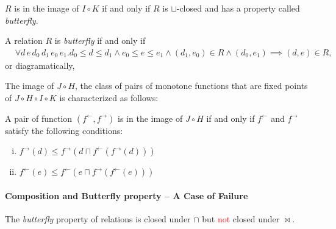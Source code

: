 \documentclass{llncs}
\newcommand{\ff}{{f^{\rightarrow}}}
\newcommand{\fb}{{f^{\leftarrow}}}
\newcommand{\join}{\sqcup}
\newcommand{\meet}{\sqcap}
\newcommand{\comp}{\circ}
\newcommand{\rotleq}{\rotatebox[origin=c]{90}{$\leq$}}
\newcommand{\red}[1]{\textcolor{red}{#1}}
\begin{document}
  \begin{proposition}\label{prop:butterfly}
    $R$ is in the image of $I \comp K$ if and only if $R$ is $\join$-closed and has a property called \emph{butterfly}.
  \end{proposition}
  \begin{definition}
    A relation $R$ is \emph{butterfly} if and only if \begin{align*}
      &\forall d\, e\, d_{0}\, d_{1 }\, e_{0}\, e_{1} .
      d_{0} \leq d \leq d_{1} \land e_{0} \leq e \leq e_{1} \land (d_{1}, e_{0}) \in R \land (d_{0}, e_{1}) \implies (d, e) \in R,
    \end{align*}or diagramatically, \quad
  \end{definition}

  The image of $J \comp H$, the class of pairs of monotone functions that are fixed points of $J \comp H \comp I \comp K$ is characterized as follows:
  \begin{proposition}
    A pair of function $(\fb , \ff)$ is in the image of $J \comp H$ if and only if $\fb$ and $\ff$ satisfy the following conditions:
    \begin{enumerate}[i.]
      \item $\ff(d) \leq \ff(d \meet \fb (\ff(d)))$
      \item $\fb(e) \leq \fb(e \meet \ff (\fb(e)))$
    \end{enumerate}
  \end{proposition}
  \paragraph{Composition and Butterfly property -- A Case of Failure}
  The \emph{butterfly} property of relations is closed under $\cap$ but \red{not} closed under $\bowtie$.
\end{document}
